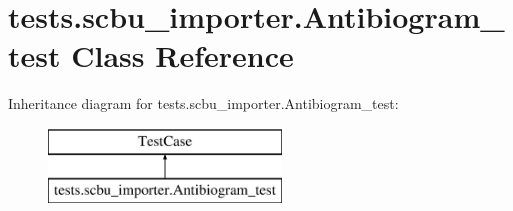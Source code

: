 \hypertarget{classtests_1_1scbu__importer_1_1_antibiogram__test}{\section{tests.\-scbu\-\_\-importer.\-Antibiogram\-\_\-test Class Reference}
\label{classtests_1_1scbu__importer_1_1_antibiogram__test}
}
Inheritance diagram for tests.\-scbu\-\_\-importer.\-Antibiogram\-\_\-test\-:\begin{figure}[H]
\begin{center}
\leavevmode
\includegraphics[height=2.000000cm]{classtests_1_1scbu__importer_1_1_antibiogram__test}
\end{center}
\end{figure}
